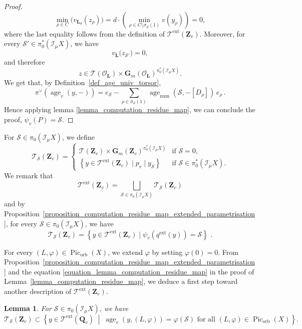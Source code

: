 \documentclass{proc-l}
\newcommand{\Z}{\mathbf{Z}}
\newcommand{\Q}{\mathbf{Q}}
\newcommand{\Le}{\mathbf{L}}
\newcommand{\G}{\mathbf{G}}
\DeclareMathOperator{\Pic}{Pic}
\DeclareMathOperator{\num}{num}
\DeclareMathOperator{\age}{age}
\DeclareMathOperator{\orb}{orb}
\DeclareMathOperator{\ext}{ext}
\newcommand{\stackS}{\mathcal{S}}
\newcommand{\stackT}{\mathcal{T}}
\newcommand{\sheafI}{\mathcal{I}}
\newcommand{\sheafO}{\mathcal{O}}
\newcommand{\sector}{\pi_0(\sheafI_{\mu} X)}
\newcommand{\twistsector}{\pi_0^*(\sheafI_{\mu} X)}
\newtheorem{lemma}[theorem]{Lemma}
\theoremstyle{definition}
\theoremstyle{remark}
\numberwithin{equation}{section}
\begin{document}
\begin{proof}
\[
\min_{\rho \in C}\bigl(v_{\Le_d}(z_{\rho})\bigr)
=
d \cdot
\left(
\min_{\rho \in C \setminus \sigma_\stackS(1)}
v(y_{\rho})
\right)
= 0,
\]
where the last equality follows from the definition of
$\stackT^{\ext}(\Z_v)$. Moreover, for every $\stackS' \in \twistsector$, we have
\[
v_{\Le}\bigl(z_{\stackS'}\bigr) = 0,
\]
and therefore
\[
z \in \stackT(\sheafO_{\Le}) \times \G_m(\sheafO_{\Le})^{\twistsector}.
\]We get that, by Definition~\ref{def_age_univ_torsor},
\[
\pi^{\vee}\!\left( \age_v(y,-) \right)
=
e_{\stackS} -
\sum_{\rho \in \sigma_\stackS(1)}
\age_{\num}\!\left(\stackS,-[D_{\rho}]\right)\, e_{\rho} \, .
\]Hence applying lemma \ref{lemma_computation_residue_map}, we can conclude the proof, $\psi_v(P) = \stackS$.

\end{proof}

For $\stackS \in \sector$, we define
\begin{equation}\label{equation_definition_notation_t_stacks}
    \stackT_{\stackS}(\Z_v)=
    \begin{cases}
        \stackT(\Z_v)\times \G_m(\Z_v)^{\twistsector} & \text{if } \stackS=0, \\[10pt]
        \left\{y\in\stackT^{\ext}(\Z_v)\mid p_v\mid y_{\stackS}\right\}
        & \text{if } \stackS\in\twistsector .
    \end{cases}
\end{equation}
We remark that
\[
\stackT^{\ext}(\Z_v)=\bigsqcup_{\stackS\in\sector}\stackT_{\stackS}(\Z_v) 
\]and by Proposition~\ref{proposition_computation_residue_map_extended_parametrisation}, for every $\stackS \in \sector$, we have
\begin{equation}\label{equation_description_2_stackT_ext_local}
    \stackT_{\stackS}(\Z_v) = \left\{y\in\stackT^{\ext}(\Z_v) \mid \psi_v\left(q^{\ext}(y)\right) = \stackS \right\} \, \, .
\end{equation}

For every $(L,\varphi)\in\Pic_{\orb}(X)$, we extend $\varphi$ by setting
$\varphi(0)=0$. From Proposition~\ref{proposition_computation_residue_map_extended_parametrisation}
and the equation \eqref{equation_lemma_computation_residue_map} in the proof of Lemma~\ref{lemma_computation_residue_map}, we deduce a first step toward another description of $\stackT^{\ext}(\Z_v)$.

\begin{lemma}\label{lemma_description_first_inclusion_extended_parametrisation}
For $\stackS\in\sector$, we have
\[
\stackT_{\stackS}(\Z_v)\subset
\left\{
y\in\stackT^{\ext}(\Q_v)\;\middle|\;
\age_v(y,(L,\varphi))=\varphi(\stackS)
\text{ for all } (L,\varphi)\in\Pic_{\orb}(X)
\right\}.
\]
\end{lemma}
\end{document}
